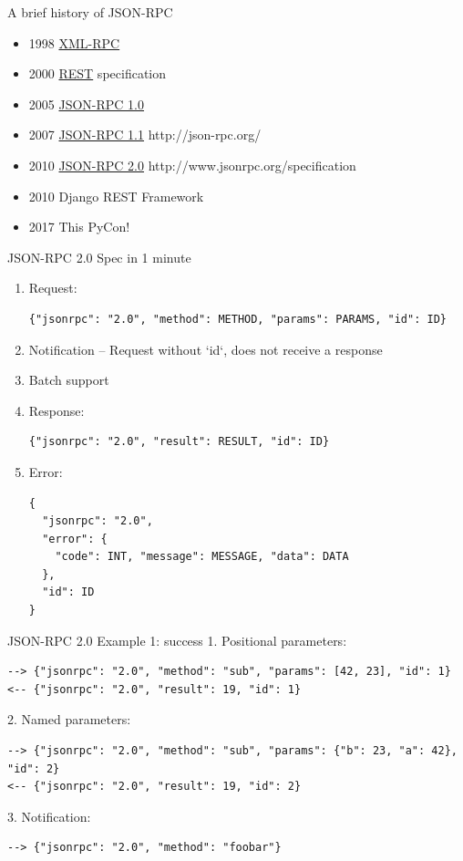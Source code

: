 \documentclass[unicode, notheorems, aspectratio=169]{beamer}
\begin{document}
\begin{frame}{A brief history of JSON-RPC}
\begin{itemize}
\item 1998 \href{https://en.wikipedia.org/wiki/XML-RPC}{XML-RPC}
\item 2000 \href{https://en.wikipedia.org/wiki/Representational\_state\_transfer}{REST} specification
\item 2005 \href{https://en.wikipedia.org/wiki/JSON-RPC}{JSON-RPC 1.0}
\item 2007 \href{http://json-rpc.org/} {JSON-RPC 1.1} http://json-rpc.org/
\item 2010 \href{http://www.jsonrpc.org/specification}{JSON-RPC 2.0} http://www.jsonrpc.org/specification
\item 2010 Django REST Framework
\item 2017 This PyCon!
\end{itemize}
\end{frame}

\begin{frame}[fragile]{JSON-RPC 2.0 Spec in 1 minute}
\begin{enumerate}
\item Request:
\begin{verbatim}
{"jsonrpc": "2.0", "method": METHOD, "params": PARAMS, "id": ID}
\end{verbatim}
\item Notification -- Request without `id`, does not receive a response
\item Batch support
\item Response:
\begin{verbatim}
{"jsonrpc": "2.0", "result": RESULT, "id": ID}
\end{verbatim}
\item Error:
\begin{verbatim}
{
  "jsonrpc": "2.0",
  "error": {
    "code": INT, "message": MESSAGE, "data": DATA
  },
  "id": ID
}
\end{verbatim}
\end{enumerate}
\end{frame}

\begin{frame}[fragile]{JSON-RPC 2.0 Example 1: success}
1. Positional parameters:
{\small
\begin{verbatim}
--> {"jsonrpc": "2.0", "method": "sub", "params": [42, 23], "id": 1}
<-- {"jsonrpc": "2.0", "result": 19, "id": 1}
\end{verbatim}
}
\vfill
2. Named parameters:
{\small
\begin{verbatim}
--> {"jsonrpc": "2.0", "method": "sub", "params": {"b": 23, "a": 42}, "id": 2}
<-- {"jsonrpc": "2.0", "result": 19, "id": 2}
\end{verbatim}
}
\vfill
3. Notification:
{\small
\begin{verbatim}
--> {"jsonrpc": "2.0", "method": "foobar"}
\end{verbatim}
}
\end{frame}
\end{document}
